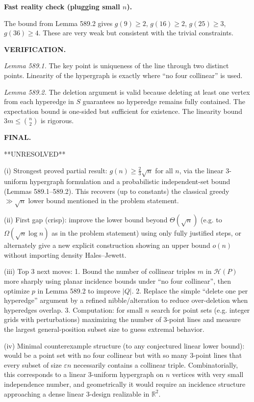 \bigskip
\noindent\textbf{Fast reality check (plugging small $n$).}

The bound from Lemma 589.2 gives $g(9)\ge 2$, $g(16)\ge 2$, $g(25)\ge 3$, $g(36)\ge 4$.
These are very weak but consistent with the trivial constraints.

\bigskip
\noindent\textbf{VERIFICATION.}

\emph{Lemma 589.1.} The key point is uniqueness of the line through two distinct points.
Linearity of the hypergraph is exactly where ``no four collinear'' is used.

\emph{Lemma 589.2.} The deletion argument is valid because deleting at least one vertex from each hyperedge in $S$ guarantees no hyperedge remains fully contained.
The expectation bound is one-sided but sufficient for existence.
The linearity bound $3m\le \binom{n}{2}$ is rigorous.

\bigskip
\noindent\textbf{FINAL.}

**UNRESOLVED**

(i) Strongest proved partial result: $g(n)\ge \frac{2}{3}\sqrt n$ for all $n$, via the linear 3-uniform hypergraph formulation and a probabilistic independent-set bound (Lemmas 589.1--589.2). This recovers (up to constants) the classical greedy $\gg \sqrt n$ lower bound mentioned in the problem statement.

(ii) First gap (crisp): improve the lower bound beyond $\Theta(\sqrt n)$ (e.g. to $\Omega(\sqrt n\log n)$ as in the problem statement) using only fully justified steps, or alternately give a new explicit construction showing an upper bound $o(n)$ without importing density Hales--Jewett.

(iii) Top 3 next moves:
1. Bound the number of collinear triples $m$ in $\mathcal{H}(P)$ more sharply using planar incidence bounds under ``no four collinear'', then optimize $p$ in Lemma 589.2 to improve $|Q|$.
2. Replace the simple ``delete one per hyperedge'' argument by a refined nibble/alteration to reduce over-deletion when hyperedges overlap.
3. Computation: for small $n$ search for point sets (e.g. integer grids with perturbations) maximizing the number of 3-point lines and measure the largest general-position subset size to guess extremal behavior.

(iv) Minimal counterexample structure (to any conjectured linear lower bound): would be a point set with no four collinear but with so many 3-point lines that every subset of size $\varepsilon n$ necessarily contains a collinear triple. Combinatorially, this corresponds to a linear 3-uniform hypergraph on $n$ vertices with very small independence number, and geometrically it would require an incidence structure approaching a dense linear 3-design realizable in $\mathbb{R}^2$.


